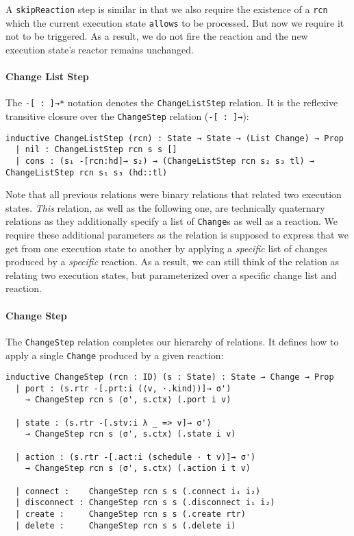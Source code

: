 A \lstinline{skipReaction} step is similar in that we also require the existence of a \lstinline{rcn} which the current execution state \lstinline{allows} to be processed.
But now we require it not to be triggered.
As a result, we do not fire the reaction and the new execution state's reactor remains unchanged.

\paragraph{Change List Step}

The \lstinline{-[ : ]→*} notation denotes the \lstinline{ChangeListStep} relation.
It is the reflexive transitive closure over the \lstinline{ChangeStep} relation (\lstinline{-[ : ]→}):

\begin{lstlisting}
inductive ChangeListStep (rcn) : State → State → (List Change) → Prop
  | nil : ChangeListStep rcn s s []
  | cons : (s₁ -[rcn:hd]→ s₂) → (ChangeListStep rcn s₂ s₃ tl) → ChangeListStep rcn s₁ s₃ (hd::tl)
\end{lstlisting}

Note that all previous relations were binary relations that related two execution states.
\emph{This} relation, as well as the following one, are technically quaternary relations as they additionally specify a list of \lstinline{Change}s as well as a reaction.
We require these additional parameters as the relation is supposed to express that we get from one execution state to another by applying a \emph{specific} list of changes produced by a \emph{specific} reaction.
As a result, we can still think of the relation as relating two execution states, but parameterized over a specific change list and reaction.

\paragraph{Change Step}

The \lstinline{ChangeStep} relation completes our hierarchy of relations.
It defines how to apply a single \lstinline{Change} produced by a given reaction:

\begin{lstlisting}
inductive ChangeStep (rcn : ID) (s : State) : State → Change → Prop 
  | port : (s.rtr -[.prt:i (⟨v, ·.kind⟩)]→ σ')    
    → ChangeStep rcn s ⟨σ', s.ctx⟩ (.port i v)

  | state : (s.rtr -[.stv:i λ _ => v]→ σ')
    → ChangeStep rcn s ⟨σ', s.ctx⟩ (.state i v)

  | action : (s.rtr -[.act:i (schedule · t v)]→ σ')
    → ChangeStep rcn s ⟨σ', s.ctx⟩ (.action i t v)

  | connect :    ChangeStep rcn s s (.connect i₁ i₂)
  | disconnect : ChangeStep rcn s s (.disconnect i₁ i₂)
  | create :     ChangeStep rcn s s (.create rtr)
  | delete :     ChangeStep rcn s s (.delete i)  
\end{lstlisting}

